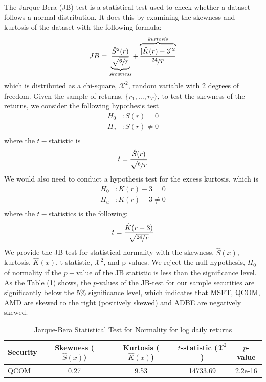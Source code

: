 \documentclass[12pt]{article}
\begin{document}
The Jarque-Bera (JB) test is a statistical test used to check whether a dataset follows a normal distribution. It does this by examining the skewness and kurtosis of the dataset with the following formula:
\begin{equation}
	JB= \underbrace{\frac{\hat{S}^2(r)}{\sqrt{\sfrac{6}{T}}}}_{\textit{skewness}}  +\overbrace{\frac{[\hat{K}(r)-3]^2}{\sfrac{24}{T}}}^{\textit{kurtosis}}
\end{equation}
which is distributed as a chi-square, $\mathcal{X}^2$, random variable with 2 degrees of freedom. Given the sample of returns, $\lbrace r_1,\ldots,r_T\rbrace$, to test the skewness of the returns, we consider the following hypothesis test
\[
\begin{aligned}
	H_0&:S(r)= 0\\
	H_a&:S(r)\neq 0\\
\end{aligned}
\]
where the $t-$statistic is 
\begin{equation}
	t=\frac{\hat{S}(r)}{\sqrt{\sfrac{6}{T}}}
\end{equation}
We would also need to conduct a hypothesis test for the excess kurtosis, which is
\[
\begin{aligned}
	H_0&:K(r)-3= 0\\
	H_a&:K(r)-3\neq 0\\
\end{aligned}
\]
where the $t-$statistics is the following:
\begin{equation}
	t=\frac{\hat{K}(r-3)}{\sqrt{\sfrac{24}{T}}}
\end{equation}
We provide the JB-test for statistical normality with the skewness, $\hat{S}(x)$, kurtosis, $\hat{K}(x)$, t-statistic, $\mathcal{X}^2$, and p-values. We reject the null-hypothesis, $H_0$ of normality if the $p-$value of the JB statistic is less than the significance level. As the Table (\ref*{tab:jbtest}) shows, the $p$-values of the JB-test for our sample securities are significantly below the 5\% significance level, which indicates that MSFT, QCOM, AMD are skewed to the right (positively skewed) and ADBE are negatively skewed.
\begin{table}[ht]
	\centering
	\caption{Jarque-Bera Statistical Test for Normality for log daily returns}
	\begin{tabular}[t]{lcccc}
		\toprule
		Security & Skewness ($\hat{S}(x)$) & Kurtosis ($\hat{K}(x)$) & $t$-statistic ($\mathcal{X}^2$) & $p$-value \\
		\midrule
		QCOM & 0.27 & 9.53 & 14733.69 & 2.2e-16 \\				
		\bottomrule
	\end{tabular}\label{tab:jbtest}
\end{table}
\end{document}

